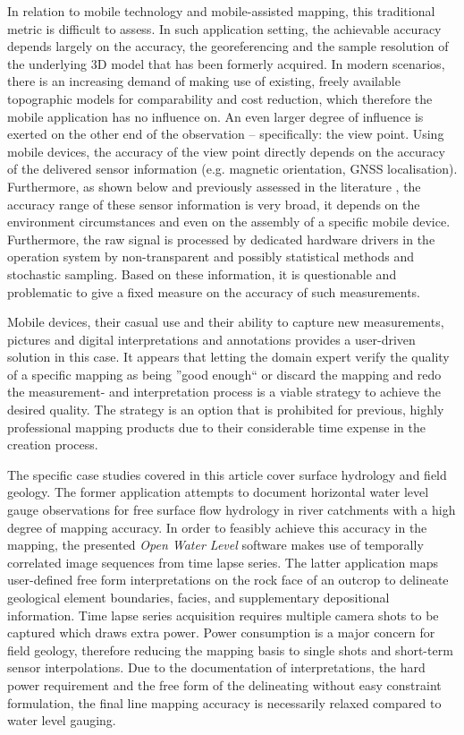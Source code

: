 \documentclass[review]{elsarticle}
\begin{document}
In relation to mobile technology and mobile-assisted mapping, this traditional metric is difficult to assess. In such application setting, the achievable accuracy depends largely on the accuracy, the georeferencing and the sample resolution of the underlying 3D model that has been formerly acquired. In modern scenarios, there is an increasing demand of making use of existing, freely available topographic models for comparability and cost reduction, which therefore the mobile application has no influence on. An even larger degree of influence is exerted on the other end of the observation -- specifically: the view point. Using mobile devices, the accuracy of the view point directly depends on the accuracy of the delivered sensor information (e.g. magnetic orientation, \gls{GNSS} localisation). Furthermore, as shown below and previously assessed in the literature \cite{Meek2013,Blum2013,Kehl2015c,Novakova2017},  the accuracy range of these sensor information is very broad, it depends on the environment circumstances and even on the assembly of a specific mobile device. Furthermore, the raw signal is processed by dedicated hardware drivers in the operation system by non-transparent and possibly statistical methods and stochastic sampling. Based on these information, it is questionable and problematic to give a fixed measure on the accuracy of such measurements.

Mobile devices, their casual use and their ability to capture new measurements, pictures and digital interpretations and annotations provides a user-driven solution in this case. It appears that letting the domain expert verify the quality of a specific mapping as being ''good enough`` or discard the mapping and redo the measurement- and interpretation process is a viable strategy to achieve the desired quality. The strategy is an option that is prohibited for previous, highly professional mapping products due to their considerable time expense in the creation process.

The specific case studies covered in this article cover surface hydrology and field geology. The former application attempts to document horizontal water level gauge observations for free surface flow hydrology in river catchments with a high degree of mapping accuracy. In order to feasibly achieve this accuracy in the mapping, the presented \textit{Open Water Level} software makes use of temporally correlated image sequences from time lapse series. The latter application maps user-defined free form interpretations on the rock face of an outcrop to delineate geological element boundaries, facies, and supplementary depositional information. Time lapse series acquisition requires multiple camera shots to be captured which draws extra power. Power consumption is a major concern for field geology, therefore reducing the mapping basis to single shots and short-term sensor interpolations. Due to the documentation of interpretations, the hard power requirement and the free form of the delineating without easy constraint formulation, the final line mapping accuracy is necessarily relaxed compared to water level gauging.
\end{document}
